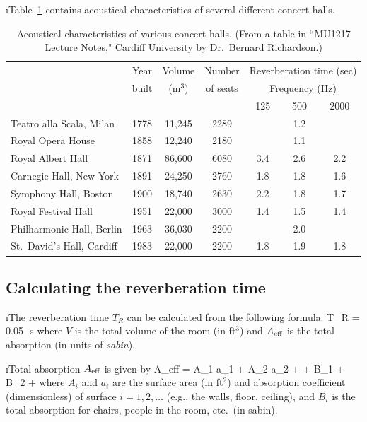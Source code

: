 \i Table~\ref{t:concert_halls} contains 
acoustical characteristics of several different concert halls.
%
\begin{table}[htbp]
\begin{center}
\begin{tabular}{l c c c c c c}
\hline
& Year & Volume & Number & \multicolumn{3}{c}{Reverberation time (sec)}\\
& built & (m${}^3$) & of seats &\multicolumn{3}{c}{\underline{Frequency (Hz)}} \\
&       &           &          & 125 & 500 & 2000 \\
\hline
Teatro alla Scala, Milan  & 1778 & 11,245 & 2289 &     & 1.2 &     \\
Royal Opera House         & 1858 & 12,240 & 2180 &     & 1.1 &     \\
Royal Albert Hall         & 1871 & 86,600 & 6080 & 3.4 & 2.6 & 2.2 \\
Carnegie Hall, New York   & 1891 & 24,250 & 2760 & 1.8 & 1.8 & 1.6 \\
Symphony Hall, Boston     & 1900 & 18,740 & 2630 & 2.2 & 1.8 & 1.7 \\
Royal Festival Hall       & 1951 & 22,000 & 3000 & 1.4 & 1.5 & 1.4 \\
Philharmonic Hall, Berlin & 1963 & 36,030 & 2200 &     & 2.0 &     \\
St.\ David's Hall, Cardiff& 1983 & 22,000 & 2200 & 1.8 & 1.9 & 1.8 \\
\hline
\end{tabular}
\caption{Acoustical characteristics of various
concert halls.
(From a table in
``MU1217 Lecture Notes," Cardiff University
by Dr.~Bernard Richardson.)}
\label{t:concert_halls}
\end{center}
\end{table}
%

\ei
\subsection{Calculating the reverberation time}

\bi

\i The reverberation time $T_R$ can be calculated from 
the following formula:
%
\be
T_R = 0.05\,~{\rm s}
\ee
%
where $V$ is the total volume of the room (in ft${}^3$)
and $A_{\rm eff}$ is the total absorption (in units of {\em sabin}).

\i Total absorption $A_{\rm eff}$ is given by
%
\be
A_{\rm eff} = A_1 a_1 + A_2 a_2 + \cdots + B_1 + B_2 + \cdots
\ee
%
where $A_i$ and $a_i$ are the surface area (in ft$^2$) 
and absorption coefficient (dimensionless) of surface 
$i=1,2,\dots$
(e.g., the walls, floor, ceiling), 
and $B_i$ is the total absorption for chairs, people
in the room, etc.~(in sabin).

